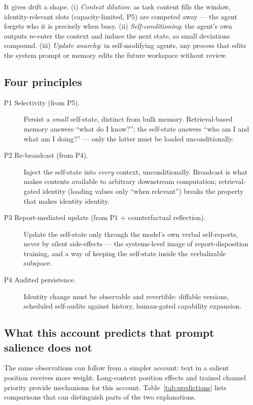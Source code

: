 \documentclass[11pt]{article}
\begin{document}
It gives drift a shape. (i) \emph{Context dilution}: as task content fills the window, identity-relevant slots (capacity-limited, P5) are competed away --- the agent forgets who it is precisely when busy. (ii) \emph{Self-conditioning}: the agent's own outputs re-enter the context and induce the next state, so small deviations compound. (iii) \emph{Update anarchy}: in self-modifying agents, any process that edits the system prompt or memory edits the future workspace without review.

\subsection{Four principles}
\begin{description}
\item[P1 Selectivity (from P5).] Persist a \emph{small} self-state, distinct from bulk memory. Retrieval-based memory answers ``what do I know?''; the self-state answers ``who am I and what am I doing?'' --- only the latter must be loaded unconditionally.
\item[P2 Re-broadcast (from P4).] Inject the self-state into \emph{every} context, unconditionally. Broadcast is what makes contents available to arbitrary downstream computation; retrieval-gated identity (loading values only ``when relevant'') breaks the property that makes identity identity.
\item[P3 Report-mediated update (from P1 + counterfactual reflection).] Update the self-state only through the model's own verbal self-reports, never by silent side-effects --- the systems-level image of report-disposition training, and a way of keeping the self-state inside the verbalizable subspace.
\item[P4 Audited persistence.] Identity change must be observable and revertible: diffable versions, scheduled self-audits against history, human-gated capability expansion.
\end{description}

\subsection{What this account predicts that prompt salience does not}
\label{sec:predictions}
The same observations can follow from a simpler account: text in a salient position receives more weight. Long-context position effects \citep{liu2024lost} and trained channel priority \citep{wallace2024hierarchy} provide mechanisms for this account. Table~\ref{tab:predictions} lists comparisons that can distinguish parts of the two explanations.
\end{document}
